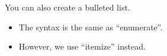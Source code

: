 \documentclass[11pt]{article}
\theoremstyle{plain} %
\theoremstyle{definition}
\theoremstyle{example}
\theoremstyle{remark}
\begin{document}
\bigskip

You can also create a bulleted list.
\begin{itemize}
	\item The syntax is the same as ``enumerate''.
	\item However, we use ``itemize'' instead.
\end{itemize}
\end{document}
